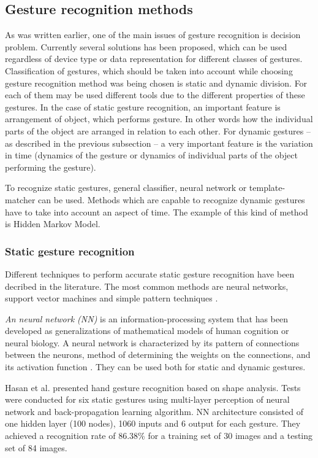 \subsection{Gesture recognition methods}
As was written earlier, one of the main issues of gesture recognition is decision problem. Currently several solutions has been proposed, which can be used regardless of device type or data representation for different classes of gestures. Classification of gestures, which should be taken into account while choosing gesture recognition method was being chosen is static and dynamic division. For each of them may be used different tools due to the different properties of these gestures. In the case of static gesture recognition, an important feature is arrangement of object, which performs gesture. In other words how the individual parts of the object are arranged in relation to each other. For dynamic gestures -- as described in the previous subsection -- a very important feature is the variation in time (dynamics of the gesture or dynamics of individual parts of the object performing the gesture).

To recognize static gestures, general classifier, neural network or template-matcher can be used. Methods which are capable to recognize dynamic gestures have to take into account an aspect of time. The example of this kind of method is Hidden Markov Model.

\subsubsection{Static gesture recognition}

Different techniques to perform accurate static gesture recognition have been decribed in the literature. The most common methods are neural networks, support vector machines and simple pattern techniques \cite{journals/jbcs/SavarisW10}.

\emph{An neural network (NN)} is an information-processing system that has been developed as generalizations of mathematical models of human cognition or neural biology. A neural network is characterized by its pattern of connections between the neurons, method of determining the weights on the connections, and its activation function \cite{Fausett:1994:FNN:197023}. They can be used both for static and dynamic gestures.

Hasan et al. \cite{HasanStaticHand} presented hand gesture recognition based on shape analysis. Tests were conducted for six static gestures using multi-layer perception of neural network and back-propagation learning algorithm. NN architecture consisted of one hidden layer (100 nodes), 1060 inputs and 6 output for each gesture. They achieved a recognition rate of 86.38\% for a training set of 30 images and a testing set of 84 images.

